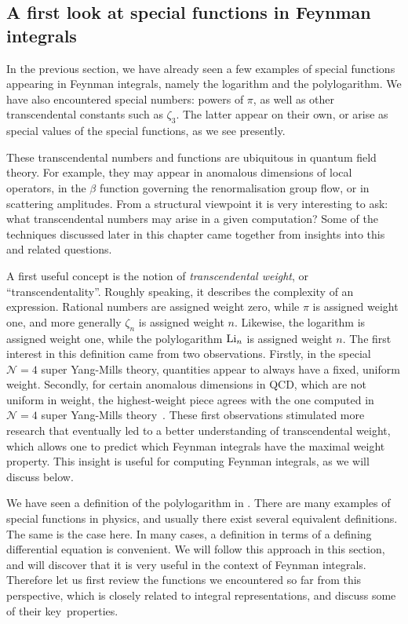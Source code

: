  \subsection{A first look at special functions in Feynman integrals}
 

In the previous section, we have already seen a few examples of special functions appearing in Feynman integrals,
namely the logarithm and the polylogarithm. We have also encountered special numbers: powers of $\pi$, as well as other transcendental constants such as $\zeta_3$.
The latter appear on their own, or arise as special values of the special functions, as we see presently.

These transcendental numbers and functions are ubiquitous in quantum field theory. For example, they may appear in anomalous dimensions of local operators, in the $\beta$ function governing the renormalisation group flow, or in scattering amplitudes. 
From a structural viewpoint it is very interesting to ask: what transcendental numbers may arise in a given computation?
Some of the techniques discussed later in this chapter came together from insights into this and related questions.

A first useful concept is the notion of \emph{transcendental weight}, or ``transcendentality''.
Roughly speaking, it describes the complexity of an expression. Rational numbers are assigned weight zero, while $\pi$ is assigned weight one, and more generally $\zeta_n$ is assigned weight $n$.
Likewise, the logarithm is assigned weight one, while the polylogarithm ${\rm Li}_n$ is assigned weight $n$.
The first interest in this definition came from two observations. Firstly, in the special ${\mathcal{N}}=4$ super Yang-Mills theory, quantities appear to always have a fixed, uniform weight. Secondly, for certain anomalous dimensions in QCD, which are not uniform in weight, the highest-weight piece agrees with the one computed in ${\mathcal{N}}=4$ super Yang-Mills theory~\cite{ch4Kotikov:2002ab}. These first observations stimulated more research that eventually led to a better understanding of transcendental weight, which allows one to predict which Feynman integrals have the maximal weight property. This insight is  useful for computing Feynman integrals, as we will discuss below.

We have seen a definition of the polylogarithm in . 
There are many examples of special functions in physics, and usually there exist several equivalent definitions.
The same is the case here. 
In many cases, a definition in terms of a defining differential equation is convenient.
We will follow this approach in this section, and will discover that it is very useful in the context of Feynman integrals.
Therefore let us first review the functions we encountered so far from this perspective, which is closely related to integral representations, and discuss some of their key~properties.

